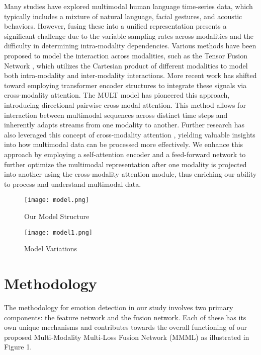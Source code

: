 \documentclass[11pt]{article}
\begin{document}
Many studies have explored multimodal human language time-series data, which typically includes a mixture of natural language, facial gestures, and acoustic behaviors. However, fusing these into a unified representation presents a significant challenge due to the variable sampling rates across modalities and the difficulty in determining intra-modality dependencies. Various methods have been proposed to model the interaction across modalities, such as the Tensor Fusion Network \cite{zadeh2017tensor}, which utilizes the Cartesian product of different modalities to model both intra-modality and inter-modality interactions. More recent work has shifted toward employing transformer encoder structures to integrate these signals via cross-modality attention. The MULT model \cite{tsai2019multimodal} has pioneered this approach, introducing directional pairwise cross-modal attention. This method allows for interaction between multimodal sequences across distinct time steps and inherently adapts streams from one modality to another.  
Further research has also leveraged this concept of cross-modality attention \cite{9928357} \cite{paraskevopoulos2022mmlatch}, yielding valuable insights into how multimodal data can be processed more effectively. We enhance this approach by employing a self-attention encoder and a feed-forward network to further optimize the multimodal representation after one modality is projected into another using the cross-modality attention module, thus enriching our ability to process and understand multimodal data.


\begin{figure*}[ht]
  \centering
  \begin{minipage}{0.5\textwidth}
    \centering
    \texttt{[image: model.png]}
    \caption{Our Model Structure}
    \label{fig:label1}
  \end{minipage}\hfill
  \begin{minipage}{0.5\textwidth}
    \centering
    \texttt{[image: model1.png]}
    \caption{Model Variations}
    \label{fig:label2}
  \end{minipage}
\end{figure*}

\section{Methodology}
The methodology for emotion detection in our study involves two primary components: the feature network and the fusion network. Each of these has its own unique mechanisms and contributes towards the overall functioning of our proposed Multi-Modality Multi-Loss Fusion Network (MMML) as illustrated in Figure 1. 
\end{document}
